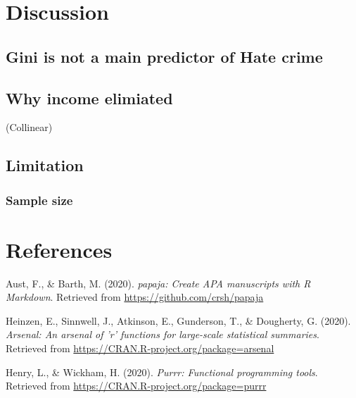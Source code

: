 \documentclass[
  english,
  man]{apa6}
\begin{document}
\hypertarget{discussion}{%
\section{Discussion}\label{discussion}}

\hypertarget{gini-is-not-a-main-predictor-of-hate-crime}{%
\subsection{Gini is not a main predictor of Hate crime}\label{gini-is-not-a-main-predictor-of-hate-crime}}

\hypertarget{why-income-elimiated}{%
\subsection{Why income elimiated}\label{why-income-elimiated}}

(Collinear)

\hypertarget{limitation}{%
\subsection{Limitation}\label{limitation}}

\hypertarget{sample-size}{%
\subsubsection{Sample size}\label{sample-size}}

\newpage

\hypertarget{references}{%
\section{References}\label{references}}

\begingroup
\setlength{\parindent}{-0.5in}
\setlength{\leftskip}{0.5in}

\hypertarget{refs}{}
\leavevmode\hypertarget{ref-R-papaja}{}%
Aust, F., \& Barth, M. (2020). \emph{papaja: Create APA manuscripts with R Markdown}. Retrieved from \url{https://github.com/crsh/papaja}

\leavevmode\hypertarget{ref-R-arsenal}{}%
Heinzen, E., Sinnwell, J., Atkinson, E., Gunderson, T., \& Dougherty, G. (2020). \emph{Arsenal: An arsenal of 'r' functions for large-scale statistical summaries}. Retrieved from \url{https://CRAN.R-project.org/package=arsenal}

\leavevmode\hypertarget{ref-R-purrr}{}%
Henry, L., \& Wickham, H. (2020). \emph{Purrr: Functional programming tools}. Retrieved from \url{https://CRAN.R-project.org/package=purrr}
\end{document}
